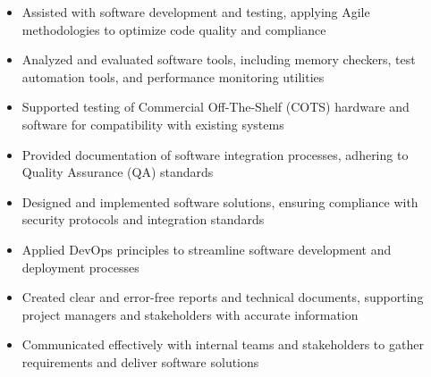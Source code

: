 \par\smallskip
\noindent
\begin{minipage}{20cm}
  \begin{minipage}{9.75cm}
    \begin{itemize}
      \item Assisted with software development and testing, applying Agile methodologies to optimize code quality and compliance
      \item Analyzed and evaluated software tools, including memory checkers, test automation tools, and performance monitoring utilities
    \end{itemize}
  \end{minipage}
  \hfill
  \begin{minipage}{9.75cm}
    \begin{itemize}
      \item Supported testing of Commercial Off-The-Shelf (COTS) hardware and software for compatibility with existing systems
      \item Provided documentation of software integration processes, adhering to Quality Assurance (QA) standards
    \end{itemize}
  \end{minipage}
\end{minipage}
\par\smallskip
\divider

\par\smallskip
\noindent
\begin{minipage}{20cm}
  \begin{minipage}{9.75cm}
    \begin{itemize}
      \item Designed and implemented software solutions, ensuring compliance with security protocols and integration standards
      \item Applied DevOps principles to streamline software development and deployment processes
    \end{itemize}
  \end{minipage}
  \hfill
  \begin{minipage}{9.75cm}
    \begin{itemize}
      \item Created clear and error-free reports and technical documents, supporting project managers and stakeholders with accurate information
      \item Communicated effectively with internal teams and stakeholders to gather requirements and deliver software solutions
    \end{itemize}
  \end{minipage}
\end{minipage}


